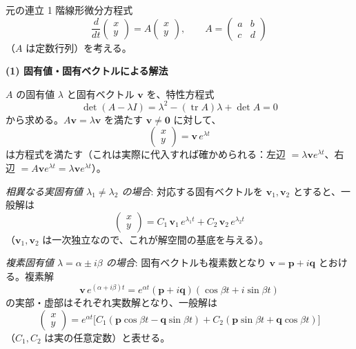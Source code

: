 \documentclass[a4paper,11pt]{article}
\begin{document}


 元の連立 1 階線形微分方程式
\[
\frac{d}{dt}\begin{pmatrix} x \\ y \end{pmatrix}
= A \begin{pmatrix} x \\ y \end{pmatrix},
\qquad
A = \begin{pmatrix} a & b \\ c & d \end{pmatrix}
\]
（$A$ は定数行列）を考える。

\medskip
\noindent
\textbf{(1) 固有値・固有ベクトルによる解法}

\noindent
$A$ の固有値 $\lambda$ と固有ベクトル $\mathbf{v}$ を、特性方程式
\[
\det(A - \lambda I) = \lambda^{2} - (\operatorname{tr} A)\lambda + \det A = 0
\]
から求める。$A\mathbf{v} = \lambda \mathbf{v}$ を満たす $\mathbf{v} \neq \mathbf{0}$ に対して、
\[
\begin{pmatrix} x \\ y \end{pmatrix} = \mathbf{v}\, e^{\lambda t}
\]
は方程式を満たす（これは実際に代入すれば確かめられる：左辺 $= \lambda \mathbf{v} e^{\lambda t}$、右辺 $= A\mathbf{v} e^{\lambda t} = \lambda \mathbf{v} e^{\lambda t}$）。

\smallskip
\noindent
\emph{相異なる実固有値 $\lambda_{1} \neq \lambda_{2}$ の場合}: 対応する固有ベクトルを $\mathbf{v}_{1}, \mathbf{v}_{2}$ とすると、一般解は
\[
\begin{pmatrix} x \\ y \end{pmatrix}
= C_{1}\, \mathbf{v}_{1}\, e^{\lambda_{1} t} + C_{2}\, \mathbf{v}_{2}\, e^{\lambda_{2} t}
\]
（$\mathbf{v}_{1}, \mathbf{v}_{2}$ は一次独立なので、これが解空間の基底を与える）。

\smallskip
\noindent
\emph{複素固有値 $\lambda = \alpha \pm i\beta$ の場合}: 固有ベクトルも複素数となり $\mathbf{v} = \mathbf{p} + i\mathbf{q}$ とおける。複素解
\[
\mathbf{v}\,e^{(\alpha+i\beta)t}
= e^{\alpha t}(\mathbf{p} + i\mathbf{q})(\cos\beta t + i\sin\beta t)
\]
の実部・虚部はそれぞれ実数解となり、一般解は
\[
\begin{pmatrix} x \\ y \end{pmatrix}
= e^{\alpha t}\Big[ C_{1}(\mathbf{p}\cos\beta t - \mathbf{q}\sin\beta t) + C_{2}(\mathbf{p}\sin\beta t + \mathbf{q}\cos\beta t) \Big]
\]
（$C_1, C_2$ は実の任意定数）と表せる。
\end{document}
